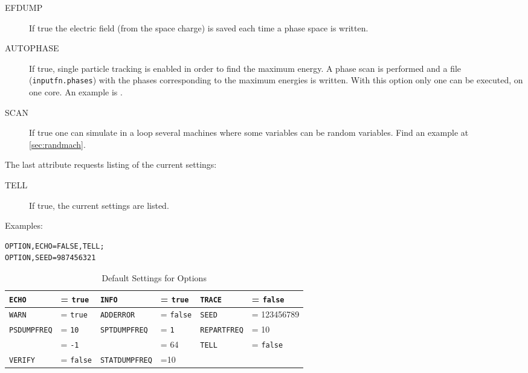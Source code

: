 \begin{description}
\item[EFDUMP]
 If true the electric field (from the space charge) is saved each time a phase space is written. 

\item[AUTOPHASE]
 If true, single particle tracking is enabled in order to find the maximum energy. A phase scan is performed and a file ({\tt inputfn.phases}) with
 the phases corresponding to the maximum energies is written. With this option only one  can be executed, on one core. An example
 is .

\item[SCAN]
 If true one can simulate in a loop several machines where some variables can be random variables. Find an
 example at \ref{sec:randmach}. 

\end{description}

The last attribute requests listing of the current settings:
\begin{description}
\item[TELL]
  If true, the current settings are listed.
\end{description}


\noindent Examples:
\begin{verbatim}
OPTION,ECHO=FALSE,TELL;
OPTION,SEED=987456321
\end{verbatim}

\begin{table}[ht] \footnotesize
  \caption{Default Settings for Options}
  \label{tab:option}
  \begin{center}
    \begin{tabular}{|ll|ll|ll|}
      \hline
      \texttt{ECHO}     & = \texttt{true}  &
      \texttt{INFO}     & = \texttt{true}  &
      \texttt{TRACE}    & = \texttt{false} \\
      \hline
      \texttt{WARN}     & = \texttt{true } &
      \texttt{ADDERROR} & = \texttt{false} &
      \texttt{SEED}     & = 123456789      \\
      \hline
       \texttt{PSDUMPFREQ} & = \texttt{10 } &
      \texttt{SPTDUMPFREQ} & = \texttt{1} &
      \texttt{REPARTFREQ}  & = 10  \\
      \hline
      \texttt{ }     & = \texttt{-1 } &
      \texttt{ }     &  = 64 &
      \texttt{TELL}     & = \texttt{false} \\
      \hline
      \texttt{VERIFY}   & = \texttt{false} &
      \texttt{STATDUMPFREQ}     & =10  &
      \texttt{}     & \\
      \hline
    \end{tabular}
  \end{center}
\end{table}


